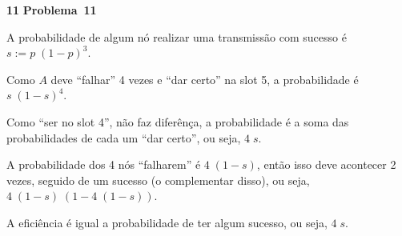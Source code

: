 \documentclass{article}
\newcounter{exe-list}
\newenvironment{exe-list}
    {\begin{list}{\alph{exe-list}.}{\usecounter{exe-list}}}
    {\end{list}}
\newenvironment{exe}[2][Problema]
    {\newcommand{\opt}{(Opcional)}%
    \newcommand{\sketch}[1]{{\bfseries Rascunho:} ##1}%
    \medskip\par\noindent\ifthenelse{\equal{#1}{}}
        {\textbf{\large #2}}
        {\textbf{\large #1~#2}}%
    \medskip\par\noindent}
    {\medskip}
\begin{document}
\begin{exe}{11}
    A probabilidade de algum nó
    realizar uma transmissão com sucesso é
    \(s := p \; (1 - p)^3\).
    \begin{exe-list}
    \item
        Como \(A\) deve ``falhar'' 4 vezes
        e ``dar certo'' na slot 5,
        a probabilidade é \(s \; (1 - s)^4\).
    \item
        Como ``ser no slot 4'',
        não faz diferênça,
        a probabilidade é a soma
        das probabilidades de cada um ``dar certo'',
        ou seja, \(4 \; s\).
    \item
        A probabilidade dos 4 nós ``falharem'' é
        \(4 \; (1 - s)\),
        então isso deve acontecer 2 vezes,
        seguido de um sucesso (o complementar disso),
        ou seja, \(4 \; (1 - s) \; (1 - 4 \; (1 - s))\).
    \item
        A eficiência é igual a probabilidade de ter algum sucesso,
        ou seja, \(4 \; s\).
    \end{exe-list}
\end{exe}
\end{document}
